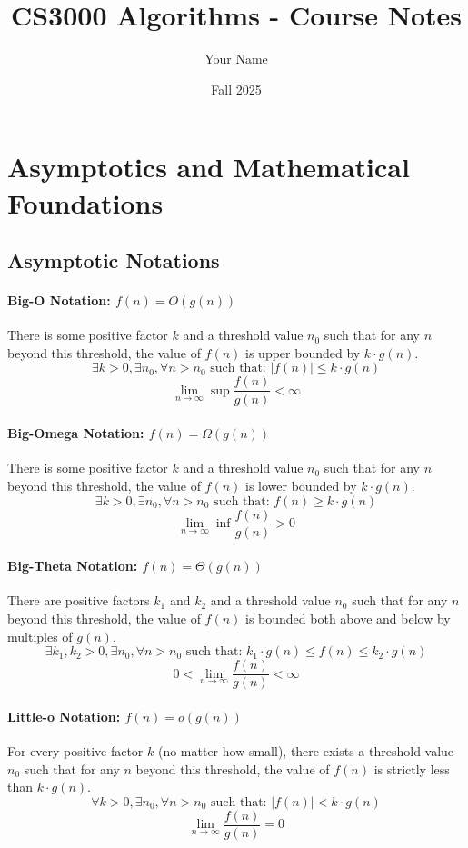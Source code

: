 \documentclass[11pt]{article}
\title{CS3000 Algorithms - Course Notes}
\author{Your Name}
\date{Fall 2025}
\theoremstyle{definition}
\begin{document}
\maketitle
\tableofcontents
\newpage

\section{Asymptotics and Mathematical Foundations}

    \subsection{Asymptotic Notations}        
        \paragraph{Big-O Notation: $f(n) = O(g(n))$}
        There is some positive factor $k$ and a threshold value $n_0$ such that for any $n$ beyond this threshold, the value of $f(n)$ is upper bounded by $k \cdot g(n)$.
        $$\exists k > 0, \exists n_0, \forall n > n_0 \text{ such that: } |f(n)| \leq k \cdot g(n)$$
        $$\lim_{n \to \infty} \sup \frac{f(n)}{g(n)} < \infty$$
        
        \paragraph{Big-Omega Notation: $f(n) = \Omega(g(n))$}
        There is some positive factor $k$ and a threshold value $n_0$ such that for any $n$ beyond this threshold, the value of $f(n)$ is lower bounded by $k \cdot g(n)$.
        $$\exists k > 0, \exists n_0, \forall n > n_0 \text{ such that: } f(n) \geq k \cdot g(n)$$
        $$\lim_{n \to \infty} \inf \frac{f(n)}{g(n)} > 0$$
        
        \paragraph{Big-Theta Notation: $f(n) = \Theta(g(n))$}
        There are positive factors $k_1$ and $k_2$ and a threshold value $n_0$ such that for any $n$ beyond this threshold, the value of $f(n)$ is bounded both above and below by multiples of $g(n)$.
        $$\exists k_1, k_2 > 0, \exists n_0, \forall n > n_0 \text{ such that: } k_1 \cdot g(n) \leq f(n) \leq k_2 \cdot g(n)$$
        $$0 < \lim_{n \to \infty} \frac{f(n)}{g(n)} < \infty$$
        
        \paragraph{Little-o Notation: $f(n) = o(g(n))$}
        For every positive factor $k$ (no matter how small), there exists a threshold value $n_0$ such that for any $n$ beyond this threshold, the value of $f(n)$ is strictly less than $k \cdot g(n)$.
        $$\forall k > 0, \exists n_0, \forall n > n_0 \text{ such that: } |f(n)| < k \cdot g(n)$$
        $$\lim_{n \to \infty} \frac{f(n)}{g(n)} = 0$$
        
\end{document}
